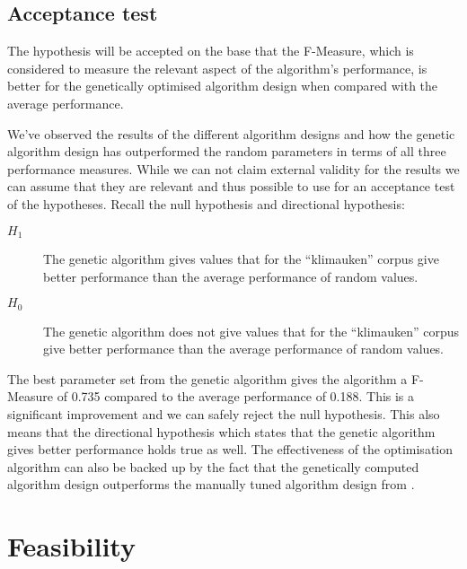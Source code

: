\subsection{Acceptance test}
The hypothesis will be accepted on the base that the F-Measure, which is considered to measure the relevant aspect of the \CTC algorithm's performance, is better for the genetically optimised algorithm design when compared with the average performance.

We've observed the results of the different algorithm designs and how the genetic algorithm design has outperformed the random parameters in terms of all three performance measures. While we can not claim external validity for the results we can assume that they are relevant and thus possible to use for an acceptance test of the hypotheses. Recall the null hypothesis and directional hypothesis:

\begin{description}
	\item [\(H_{1}\)] The genetic algorithm gives values that for the ``klimauken'' corpus give better performance than the average performance of random values.
	\item [\(H_{0}\)] The genetic algorithm does not give values that for the ``klimauken'' corpus give better performance than the average performance of random values.
\end{description}

The best parameter set from the genetic algorithm gives the \CTC algorithm a F-Measure of 0.735 compared to the average performance of 0.188. This is a significant improvement and we can safely reject the null hypothesis. This also means that the directional hypothesis which states that the genetic algorithm gives better performance holds true as well. The effectiveness of the optimisation algorithm can also be backed up by the fact that the genetically computed algorithm design outperforms the manually tuned algorithm design from \cite{Moe2014compact}.

\section{Feasibility}

